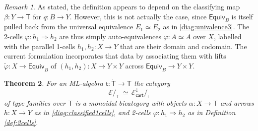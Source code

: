 \documentclass[12pt,reqno]{amsart}
\newcommand{\EE}{\ensuremath{\mathcal{E}}}
\renewcommand{\to}{\ensuremath{\rightarrow}}
\renewcommand{\t}{\ensuremath{\mathsf{t}}}
\newcommand{\T}{\ensuremath{\mathsf{T}}}
\newcommand{\TT}{\ensuremath{\dot{\mathsf{T}}}}
\newtheorem{theorem}{Theorem}
\newtheorem{lemma}[theorem]{Lemma}
\theoremstyle{remark}
\newtheorem{remark}[theorem]{Remark}
\theoremstyle{definition}
\begin{document}
\begin{remark}\label{2cellsareglobal}
As stated, the definition appears to depend on the classifying map $\beta : Y\to \T$ for $q:B\to Y$. However,  this is not actually the case,
since $\mathsf{Equiv}_B$ is itself pulled back from the universal equivalence $E_1\simeq E_2$ as in \eqref{diag:univalence3}.  The 2-cells $\varphi : h_1 \Rightarrow h_2$ are thus simply auto-equivalences $\varphi: A \simeq A$ over $X$, labelled with the parallel 1-cells $h_1, h_2 : X \to Y$ that are their domain and codomain. The current formulation incorporates that data by associating them with lifts $\tilde{\varphi} : X \to \mathsf{Equiv}_B$ of $(h_1, h_2) : X \to Y \times Y$ across $\mathsf{Equiv}_B \to Y\times Y$. 
\end{remark}

%
% 
 
\begin{theorem}
For an ML-algebra $\t : \TT \to \T$ the category $$\EE/_\T\, \simeq\, \EE^{\downarrow}_{\mathsf{cart}}/_{\t}$$ of type families over $\T$ is a monoidal bicategory with objects $\alpha : X\to \T$ and arrows $h : X \to Y$ as in \eqref{diag:classified1cells}, and 2-cells $\varphi : h_1 \Rightarrow h_2$ as in Definition \ref{def:2cells}.  
\end{theorem}
\end{document}
